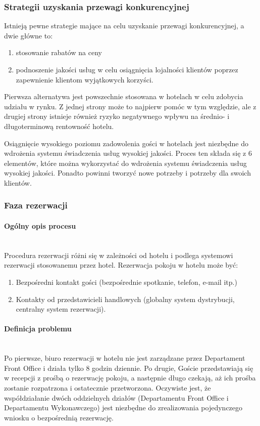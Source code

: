 \documentclass[a4paper, 12pt]{article}
\begin{document}
\subsubsection{Strategii uzyskania przewagi konkurencyjnej}
Istnieją pewne strategie mające na celu uzyskanie przewagi konkurencyjnej, a dwie główne to:
\begin{enumerate}
	\item stosowanie rabatów na ceny
	\item podnoszenie jakości usług w celu osiągnięcia lojalności klientów poprzez zapewnienie klientom wyjątkowych korzyści.
\end{enumerate}
Pierwsza alternatywa jest powszechnie stosowana w hotelach w celu zdobycia udziału w rynku. Z jednej strony może to najpierw pomóc w tym względzie, ale z drugiej strony istnieje również ryzyko negatywnego wpływu na średnio- i długoterminową rentowność hotelu.


Osiągnięcie wysokiego poziomu zadowolenia gości w hotelach jest niezbędne do wdrożenia systemu świadczenia usług wysokiej jakości. Proces ten składa się z 6 elementów, które można wykorzystać do wdrożenia systemu świadczenia usług wysokiej jakości. Ponadto powinni tworzyć nowe potrzeby i potrzeby dla swoich klientów.
\subsubsection{Faza rezerwacji}
\paragraph{Ogólny opis procesu}\mbox{}\\
Procedura rezerwacji różni się w zależności od hotelu i podlega systemowi rezerwacji stosowanemu przez hotel. Rezerwacja pokoju w hotelu może być:
\begin{enumerate}
	\item Bezpośredni kontakt gości (bezpośrednie spotkanie, telefon, e-mail itp.)
	\item Kontakty od przedstawicieli handlowych (globalny system dystrybucji, centralny system rezerwacji).
\end{enumerate}
\paragraph{Definicja problemu}\mbox{}\\
Po pierwsze, biuro rezerwacji w hotelu nie jest zarządzane przez Departament Front Office i działa tylko 8 godzin dziennie. Po drugie, Goście przedstawiają się w recepcji z prośbą o rezerwację pokoju, a następnie długo czekają, aż ich prośba zostanie rozpatrzona i ostatecznie przetworzona. Oczywiste jest, że współdziałanie dwóch oddzielnych działów (Departamentu Front Office i Departamentu Wykonawczego) jest niezbędne do zrealizowania pojedynczego wniosku o bezpośrednią rezerwację.
\end{document}
